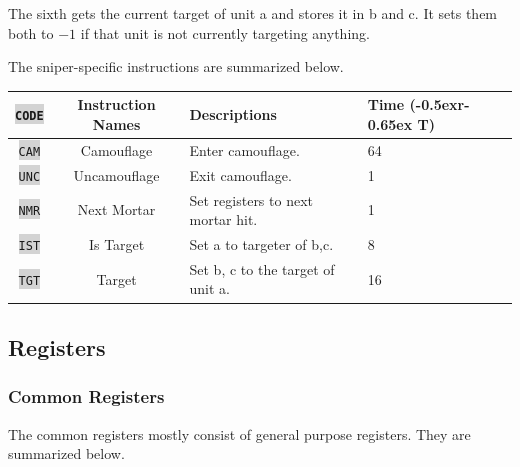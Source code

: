 \documentclass{article}
\newcommand{\vnscode}[1]{\colorbox{lightgray}{\lstinline[language=vns]{#1}}}
\newcommand{\RT}{\lower-0.5ex\hbox{r}\kern-0.65ex T}
\begin{document}
The sixth gets the current target of unit a and stores it in b and c. It sets
them both to $-1$ if that unit is not currently targeting anything.

The sniper-specific instructions are summarized below.

\begin{minipage}{\textwidth}
\label{table:sniper}
\centering
\begin{tabular}{|c|c|l|l|}
    \hline \vnscode{CODE} & Instruction Names & Descriptions & Time (\RT) \\ \hline
    \vnscode{CAM} & Camouflage & Enter camouflage. & 64 \\ \hline
    \vnscode{UNC} & Uncamouflage & Exit camouflage. & 1 \\ \hline
    \vnscode{NMR} & Next Mortar & Set registers to next mortar hit. & 1 \\ \hline
    \vnscode{IST} & Is Target & Set a to targeter of b,c. & 8 \\ \hline
    \vnscode{TGT} & Target & Set b, c to the target of unit a. & 16 \\ \hline
\end{tabular}
\end{minipage}

\subsection{Registers}


\subsubsection{Common Registers}

The common registers mostly consist of general purpose registers. They are
summarized below.
\end{document}
